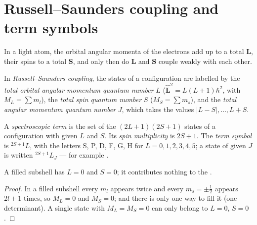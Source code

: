 \section{Russell--Saunders coupling and term symbols}

In a light atom, the orbital angular momenta of the electrons add up to a
total $\mathbf L$, their spins to a total $\mathbf S$, and only then do
$\mathbf L$ and $\mathbf S$ couple weakly with each other.

\begin{definition}\label{def:b3:many-electron-atoms:russell-saunders}
In \emph{Russell--Saunders coupling}, the
states of a configuration are labelled by the \emph{total orbital angular
momentum quantum number}
$L$ ($\hat{\mathbf L}^2 = L(L+1)\hbar^2$, with $M_L = \sum m_l$), the \emph{total
spin quantum number} $S$ ($M_S = \sum m_s$),
and the \emph{total angular momentum quantum number} $J$, which takes the values $|L - S|, \dots, L + S$.
\end{definition}

\begin{definition}\label{def:b3:many-electron-atoms:term}
A \emph{spectroscopic term} is the set of the
$(2L+1)(2S+1)$ states of a configuration with given $L$ and $S$. Its
\emph{spin multiplicity} is $2S + 1$. The \emph{term
symbol} is ${}^{2S+1}L$, with the letters S, P, D, F, G, H
for $L = 0, 1, 2, 3, 4, 5$; a state of given $J$ is written ${}^{2S+1}L_J$ ---
for example .
\end{definition}

\begin{proposition}\label{prop:b3:many-electron-atoms:closed-shell}
A filled subshell has $L = 0$ and $S = 0$; it contributes nothing to the
.
\end{proposition}

\begin{proof}
In a filled subshell every $m_l$ appears twice and every $m_s = \pm\frac12$
appears $2l+1$ times, so $M_L = 0$ and $M_S = 0$; and there is only one way to
fill it (one determinant). A single state with $M_L = M_S = 0$ can only
belong to $L = 0$, $S = 0$.
\end{proof}


